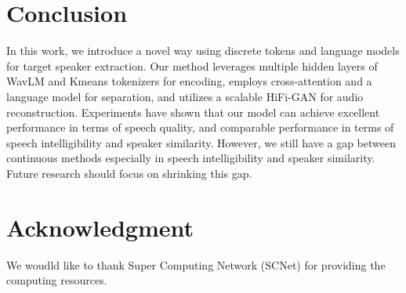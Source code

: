\documentclass[conference]{IEEEtran}
\begin{document}
\section{Conclusion}
In this work, we introduce a novel way using discrete tokens and language models for target speaker extraction.
Our method leverages multiple hidden layers of WavLM and Kmeans tokenizers for encoding, employs cross-attention and a language model for separation, and utilizes a scalable HiFi-GAN for audio reconstruction.
Experiments have 
shown that our model can achieve excellent performance in terms of speech quality, and comparable performance in terms of speech intelligibility and 
speaker similarity. However, we still have a gap between continuous methods especially in speech intelligibility and speaker similarity. Future research should focus on shrinking 
this gap. 

\section{Acknowledgment}
We woudld like to thank Super Computing Network (SCNet) for providing the computing resources. 






\end{document}
